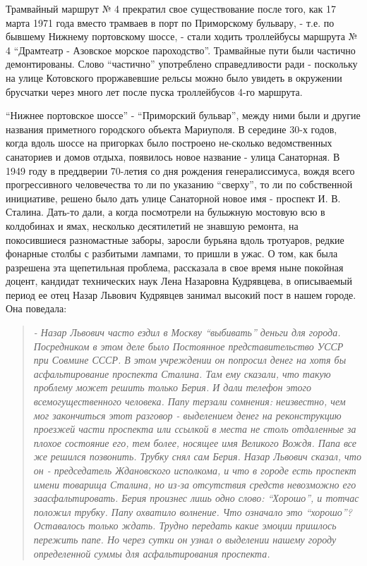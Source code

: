 
Трамвайный маршрут № 4 прекратил свое существование после того, как 17 марта
1971 года вместо трамваев в порт по Приморскому бульвару, - т.е. по бывшему
Нижнему портовскому шоссе, - стали ходить троллейбусы маршрута № 4 \enquote{Драмтеатр -
Азовское морское пароходство}. Трамвайные пути были частично демонтированы.
Слово \enquote{частично} употреблено справедливости ради - поскольку на улице
Котовского проржавевшие рельсы можно было увидеть в окружении брусчатки через
много лет после пуска троллейбусов 4-го маршрута.

\enquote{Нижнее портовское шоссе} - \enquote{Приморский бульвар}, между ними были и другие
названия приметного городского объекта Мариуполя. В середине 30-х годов, когда
вдоль шоссе на пригорках было построено не\hyp{}сколько ведомственных санаториев и
домов отдыха, появилось новое название - улица Санаторная. В 1949 году в
преддверии 70-летия со дня рождения генералиссимуса, вождя всего прогрессивного
человечества то ли по указанию \enquote{сверху}, то ли по собственной инициативе,
решено было дать улице Санаторной новое имя - проспект И. В. Сталина. Дать-то
дали, а когда посмотрели на булыжную мостовую всю в колдобинах и ямах,
несколько десятилетий не знавшую ремонта, на покосившиеся разномастные заборы,
заросли бурьяна вдоль тротуаров, редкие фонарные столбы с разбитыми лампами, то
пришли в ужас. О том, как была разрешена эта щепетильная проблема, рассказала в
свое время ныне покойная доцент, кандидат технических наук Лена Назаровна
Кудрявцева, в описываемый период ее отец Назар Львович Кудрявцев занимал
высокий пост в нашем городе. Она поведала:

\begin{quote}
\em
- Назар Львович часто ездил в Москву \enquote{выбивать} деньги для города. Посредником
в этом деле было Постоянное представительство УССР при Совмине СССР. В этом
учреждении он попросил денег на хотя бы асфальтирование проспекта Сталина. Там
ему сказали, что такую проблему может решить только Берия. И дали телефон этого
всемогущественного человека. Папу терзали сомнения: неизвестно, чем мог
закончиться этот разговор - выделением денег на реконструкцию проезжей части
проспекта или ссылкой в места не столь отдаленные за плохое состояние его, тем
более, носящее имя Великого Вождя. Папа все же решился позвонить. Трубку снял
сам Берия. Назар Львович сказал, что он - председатель Ждановского исполкома, и
что в городе есть проспект имени товарища Сталина, но из-за отсутствия средств
невозможно его заасфальтировать. Берия произнес лишь одно слово: \enquote{Хорошо}, и
тотчас положил трубку. Папу охватило волнение. Что означало это \enquote{хорошо}?
Оставалось только ждать. Трудно передать какие эмоции пришлось пережить папе.
Но через сутки он узнал о выделении нашему городу определенной суммы для
асфальтирования проспекта.
\end{quote}

